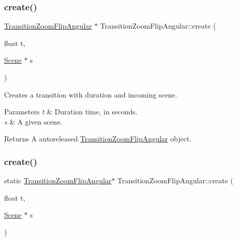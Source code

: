 \subsubsection{\texorpdfstring{create()}{create()}\hspace{0.1cm}{\footnotesize\ttfamily [3/4]}}
{\footnotesize\ttfamily \hyperlink{classTransitionZoomFlipAngular}{Transition\+Zoom\+Flip\+Angular} $\ast$ Transition\+Zoom\+Flip\+Angular\+::create (\begin{DoxyParamCaption}\item[{float}]{t,  }\item[{\hyperlink{classScene}{Scene} $\ast$}]{s }\end{DoxyParamCaption})\hspace{0.3cm}{\ttfamily [static]}}

Creates a transition with duration and incoming scene.


\begin{DoxyParams}{Parameters}
{\em t} & Duration time, in seconds. \\
\hline
{\em s} & A given scene. \\
\hline
\end{DoxyParams}
\begin{DoxyReturn}{Returns}
A autoreleased \hyperlink{classTransitionZoomFlipAngular}{Transition\+Zoom\+Flip\+Angular} object. 
\end{DoxyReturn}
\mbox{\label{classTransitionZoomFlipAngular_a07a47763505a34054ba0173ccc0e1378}} 
\subsubsection{\texorpdfstring{create()}{create()}\hspace{0.1cm}{\footnotesize\ttfamily [4/4]}}
{\footnotesize\ttfamily static \hyperlink{classTransitionZoomFlipAngular}{Transition\+Zoom\+Flip\+Angular}$\ast$ Transition\+Zoom\+Flip\+Angular\+::create (\begin{DoxyParamCaption}\item[{float}]{t,  }\item[{\hyperlink{classScene}{Scene} $\ast$}]{s }\end{DoxyParamCaption})\hspace{0.3cm}{\ttfamily [static]}}

